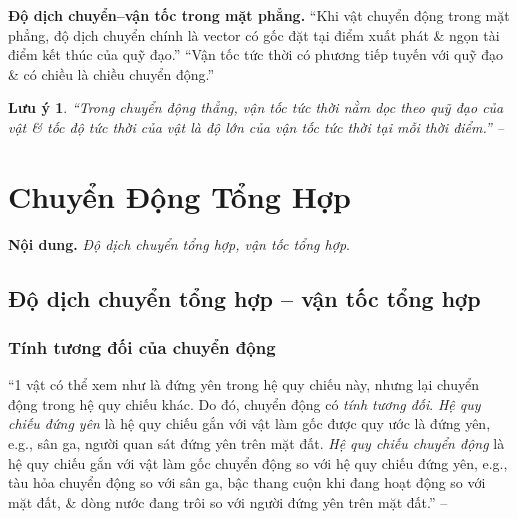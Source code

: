 \documentclass[oneside]{book}
\numberwithin{equation}{section}
\newtheorem{luuy}{Lưu ý}[section]
\begin{document}
\textbf{Độ dịch chuyển--vận tốc trong mặt phẳng.} ``Khi vật chuyển động trong mặt phẳng, độ dịch chuyển chính là vector có gốc đặt tại điểm xuất phát \& ngọn tài điểm kết thúc của quỹ đạo.'' ``Vận tốc tức thời có phương tiếp tuyến với quỹ đạo \& có chiều là chiều chuyển động.''

\begin{luuy}
	``Trong chuyển động thẳng, vận tốc tức thời nằm dọc theo quỹ đạo của vật \& tốc độ tức thời của vật là độ lớn của vận tốc tức thời tại mỗi thời điểm.'' -- \cite[p. 30]{SGK_Vat_Ly_10_Chan_Troi_Sang_Tao}
\end{luuy}


\section{Chuyển Động Tổng Hợp}
\textbf{Nội dung.} \textit{Độ dịch chuyển tổng hợp, vận tốc tổng hợp}.

\subsection{Độ dịch chuyển tổng hợp -- vận tốc tổng hợp}

\subsubsection{Tính tương đối của chuyển động}
``1 vật có thể xem như là đứng yên trong hệ quy chiếu này, nhưng lại chuyển động trong hệ quy chiếu khác. Do đó, chuyển động có \textit{tính tương đối}. \textit{Hệ quy chiếu đứng yên} là hệ quy chiếu gắn với vật làm gốc được quy ước là đứng yên, e.g., sân ga, người quan sát đứng yên trên mặt đất. \textit{Hệ quy chiếu chuyển động} là hệ quy chiếu gắn với vật làm gốc chuyển động so với hệ quy chiếu đứng yên, e.g., tàu hỏa chuyển động so với sân ga, bậc thang cuộn khi đang hoạt động so với mặt đất, \& dòng nước đang trôi so với người đứng yên trên mặt đất.'' -- \cite[p. 32]{SGK_Vat_Ly_10_Chan_Troi_Sang_Tao}
\end{document}
